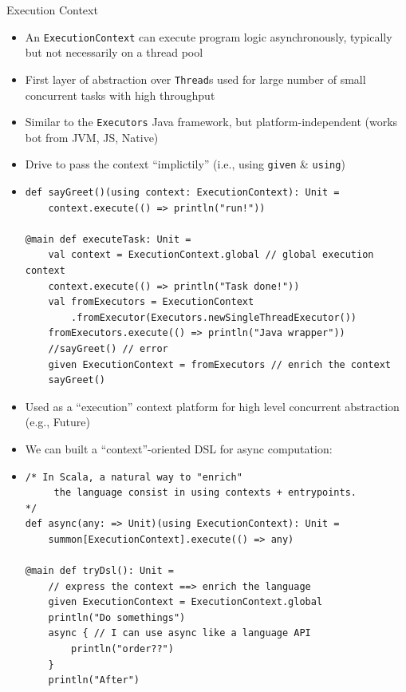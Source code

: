 \documentclass[presentation, 9pt]{beamer}\mode<presentation>{\usetheme{AMSBolognaFC}}
\begin{document}
\begin{frame}{Execution Context}
	\begin{itemize}
		\item An \texttt{ExecutionContext} can execute program logic asynchronously, typically but not necessarily on a thread pool
		\item First layer of abstraction over \texttt{Thread}s used for large number of small concurrent tasks with high
		throughput
  	\item Similar to the \texttt{Executors} Java framework, but platform-independent (works bot from JVM, JS, Native)
   	\item Drive to pass the context ``implictily'' (i.e., using \texttt{given} \& {\color{darkgreen}\texttt{using}}) 
		 \item[] \begin{tcolorbox}[left=0pt, top=0pt, bottom=0pt]
			\begin{verbatim}
def sayGreet()(using context: ExecutionContext): Unit =
	context.execute(() => println("run!"))

@main def executeTask: Unit =
	val context = ExecutionContext.global // global execution context
	context.execute(() => println("Task done!"))
	val fromExecutors = ExecutionContext
		.fromExecutor(Executors.newSingleThreadExecutor())
	fromExecutors.execute(() => println("Java wrapper"))
	//sayGreet() // error
	given ExecutionContext = fromExecutors // enrich the context
	sayGreet()
			\end{verbatim}
		\end{tcolorbox}
	\end{itemize}
	\framebreak
	\begin{itemize}
		\item Used as a ``execution'' context platform for high level concurrent abstraction (e.g., Future)
  	\item We can built a ``context''-oriented DSL for async computation:
		\item[] \begin{tcolorbox}[left=0pt, top=0pt, bottom=0pt]
			\begin{verbatim}
/* In Scala, a natural way to "enrich" 
	 the language consist in using contexts + entrypoints.
*/
def async(any: => Unit)(using ExecutionContext): Unit =
	summon[ExecutionContext].execute(() => any)

@main def tryDsl(): Unit =
	// express the context ==> enrich the language
	given ExecutionContext = ExecutionContext.global
	println("Do somethings")
	async { // I can use async like a language API
		println("order??")
	}
	println("After")
			\end{verbatim}
		\end{tcolorbox}
	\end{itemize}
\end{frame}
\end{document}
